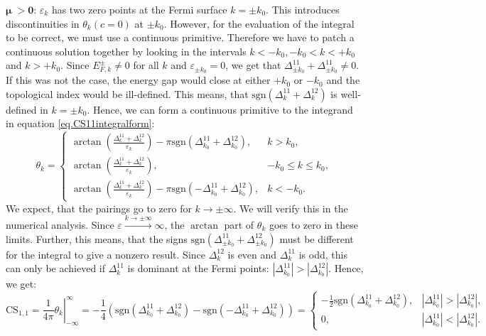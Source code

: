 $\boldsymbol\mu \; \mathbf{> 0}$: $\varepsilon_k$ has two zero points at the Fermi surface $k = \pm k_0$. This introduces discontinuities in $\theta_k(c = 0)$ at $\pm k_0$. However, for the evaluation of the integral to be correct, we must use a continuous primitive. Therefore we have to patch a continuous solution together by looking in the intervals $k < -k_0, -k_0 < k < +k_0$ and $k > +k_0$. Since $E^{\pm}_{F,k} \neq 0$ for all $k$ and $\varepsilon_{\pm k_0} = 0$, we get that $\Delta^{11}_{\pm k_0} + \Delta^{11}_{\pm k_0} \neq 0$. If this was not the case, the energy gap would close at either $+k_0$ or $-k_0$ and the topological index would be ill-defined. This means, that $\text{sgn}(\Delta^{11}_k + \Delta^{12}_k)$ is well-defined in $k = \pm k_0$. Hence, we can form a continuous primitive to the integrand in equation \eqref{eq.CS11integralform}:
\begin{equation}
\theta_k = \left\{ \begin{matrix} 
\arctan\left(\frac{\Delta^{11}_k + \Delta^{12}_k }{\varepsilon_k}\right) - \pi\text{sgn}(\Delta^{11}_{k_0} + \Delta^{12}_{k_0}), & k > k_0, \\
\arctan\left(\frac{\Delta^{11}_k + \Delta^{12}_k }{\varepsilon_k}\right), & -k_0 \leq k \leq k_0, \\
\arctan\left(\frac{\Delta^{11}_k + \Delta^{12}_k }{\varepsilon_k}\right) - \pi \text{sgn}(-\Delta^{11}_{k_0} + \Delta^{12}_{k_0}), & k < -k_0.
  \end{matrix} \right.
\label{eq.2wires.Gkmugreater0}
\end{equation}
We expect, that the pairings go to zero for $k\to \pm \infty$. We will verify this in the numerical analysis. Since $\varepsilon \overset{k\to \pm \infty}{\to} \infty$, the $\arctan$ part of $\theta_k$ goes to zero in these limits. Further, this means, that the signs $\text{sgn}(\Delta^{11}_{\pm k_0} + \Delta^{12}_{\pm k_0})$ must be different for the integral to give a nonzero result. Since $\Delta^{12}_{k}$ is even and $\Delta^{11}_{k}$ is odd, this can only be achieved if $\Delta^{11}_{k}$ is dominant at the Fermi points: $|\Delta^{11}_{k_0}| > |\Delta^{12}_{k_0}|$. Hence, we get:
\begin{equation}
\text{CS}_{1,1} = \left. \frac{1}{4\pi} \theta_k \right|^\infty_{-\infty} = -\frac{1}{4}(\text{sgn}(\Delta^{11}_{k_0} + \Delta^{12}_{k_0}) - \text{sgn}(-\Delta^{11}_{k_0} + \Delta^{12}_{k_0})) = \left\{ \begin{matrix} 
-\frac{1}{2}\text{sgn}(\Delta^{11}_{k_0} + \Delta^{12}_{k_0}) , & |\Delta^{11}_{k_0}| > |\Delta^{12}_{k_0}|, \\
0, & |\Delta^{11}_{k_0}| < |\Delta^{12}_{k_0}|.
  \end{matrix} \right. \nonumber 
\end{equation}
